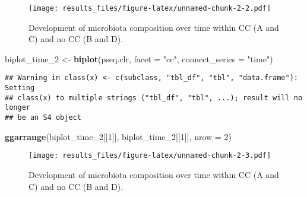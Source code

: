 \documentclass[]{article}
\newenvironment{Shaded}{\begin{snugshade}}{\end{snugshade}}
\newcommand{\KeywordTok}[1]{\textcolor[rgb]{0.13,0.29,0.53}{\textbf{#1}}}
\newcommand{\DataTypeTok}[1]{\textcolor[rgb]{0.13,0.29,0.53}{#1}}
\newcommand{\DecValTok}[1]{\textcolor[rgb]{0.00,0.00,0.81}{#1}}
\newcommand{\StringTok}[1]{\textcolor[rgb]{0.31,0.60,0.02}{#1}}
\newcommand{\OperatorTok}[1]{\textcolor[rgb]{0.81,0.36,0.00}{\textbf{#1}}}
\newcommand{\NormalTok}[1]{#1}
\begin{document}
\begin{figure}
\centering
\texttt{[image: results\_files/figure-latex/unnamed-chunk-2-2.pdf]}
\caption{Development of microbiota composition over time within CC (A
and C) and no CC (B and D).}
\end{figure}

\begin{Shaded}
\begin{Highlighting}[]
\NormalTok{biplot_time_}\DecValTok{2}\NormalTok{ <-}\StringTok{ }\KeywordTok{biplot}\NormalTok{(pseq.clr, }\DataTypeTok{facet =} \StringTok{"cc"}\NormalTok{, }\DataTypeTok{connect_series =} \StringTok{"time"}\NormalTok{)}
\end{Highlighting}
\end{Shaded}

\begin{verbatim}
## Warning in class(x) <- c(subclass, "tbl_df", "tbl", "data.frame"): Setting
## class(x) to multiple strings ("tbl_df", "tbl", ...); result will no longer
## be an S4 object
\end{verbatim}

\begin{Shaded}
\begin{Highlighting}[]
\KeywordTok{ggarrange}\NormalTok{(biplot_time_}\DecValTok{2}\NormalTok{[[}\DecValTok{1}\NormalTok{]], biplot_time_}\DecValTok{2}\NormalTok{[[}\DecValTok{1}\NormalTok{]], }\DataTypeTok{nrow =} \DecValTok{2}\NormalTok{)}
\end{Highlighting}
\end{Shaded}

\begin{figure}
\centering
\texttt{[image: results\_files/figure-latex/unnamed-chunk-2-3.pdf]}
\caption{Development of microbiota composition over time within CC (A
and C) and no CC (B and D).}
\end{figure}

\begin{Shaded}
\end{Shaded}
\end{document}
